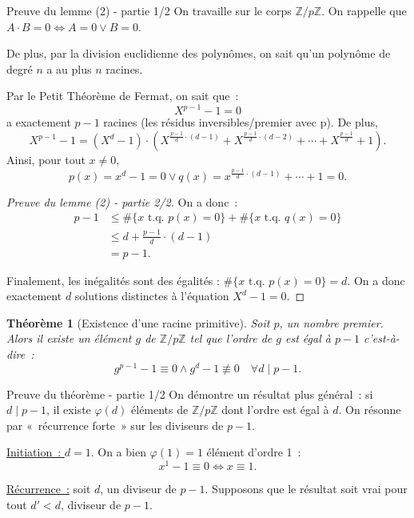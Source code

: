 \documentclass[10pt, mathserif]{beamer}
\newcommand{\tq}{\text{ t.q. }}
\newcommand{\Z}{\mathbb Z}
\newtheorem{thm}{Théorème}[section]
\theoremstyle{definition}
\theoremstyle{remark}
\begin{document}
	\begin{frame}
		\begin{block}{Preuve du lemme (2) - partie 1/2}
			On travaille sur le corps $\Z/p\Z$. On rappelle que $A \cdot B = 0\Longleftrightarrow A = 0 \lor B=0$.

			De plus, par la division euclidienne des polynômes, on sait qu'un polynôme de degré $n$ a au plus $n$ racines.

			Par le Petit Théorème de Fermat, on sait que~: \[X^{p-1}-1 = 0\] a exactement $p-1$ racines (les résidus inversibles/premier avec p). De plus,
			\[X^{p-1} - 1 = \left(X^{d}-1\right) \cdot \left(X^{\frac{p-1}{d} \cdot (d-1)} + X^{\frac{p-1}{d} \cdot (d-2)} + \dotsb + X^{\frac{p-1}{d}}+1\right).\]
			Ainsi, pour tout $x \neq 0$,
			\[p(x) = x^d-1 = 0 \lor q(x) = x^{\frac{p-1}{d} \cdot (d-1)} + \dotsb + 1 = 0.\]
		\end{block}
	\end{frame}

	\begin{frame}
		\begin{proof}[Preuve du lemme (2) - partie 2/2]
			On a donc~:
			\[\begin{aligned}
				p-1 &\leq \#\{x \tq p(x) = 0\} + \#\{x \tq q(x) = 0\} \\
				    & \leq d + \frac{p-1}{d} \cdot(d-1) \\
					&= p-1.
			\end{aligned}\]

			Finalement, les inégalités sont des égalités : $\#\{x \tq p(x) = 0\} = d$. On a donc exactement $d$ solutions distinctes à l'équation $X^d-1=0$.
		\end{proof}
	\end{frame}

	\begin{frame}
		\begin{thm}[Existence d'une racine primitive]
			Soit $p$, un nombre premier. Alors il existe un élément $g$ de $\Z/p\Z$ tel que l'ordre de $g$ est égal à $p-1$ c'est-à-dire~:
			\[g^{p-1}-1 \equiv 0 \land g^{d}-1 \not \equiv 0 \quad \forall d \mid p-1.\]
		\end{thm}

		\begin{block}{Preuve du théorème - partie 1/2}
			 On démontre un résultat plus général~: si $d \mid p-1$, il existe $\varphi(d)$ éléments de $\Z/p\Z$ dont l'ordre est égal à $d$. On résonne par
			 «~récurrence forte~» sur les diviseurs de $p-1$.
			 
			 \underline{Initiation~: $d = 1$}. On a bien $\varphi(1) = 1$ élément d'ordre 1~:
			 \[x^1 - 1 \equiv 0 \iff x \equiv 1.\]
			 
			 \underline{Récurrence~:} soit $d$, un diviseur de $p-1$. Supposons que le résultat soit vrai pour tout $d' < d$, diviseur de $p-1$.
		\end{block}
	\end{frame}
\end{document}
